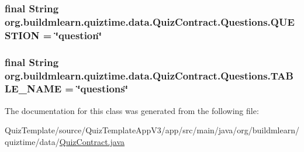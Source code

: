 \subsubsection[{\texorpdfstring{Q\+U\+E\+S\+T\+I\+ON}{QUESTION}}]{\setlength{\rightskip}{0pt plus 5cm}final String org.\+buildmlearn.\+quiztime.\+data.\+Quiz\+Contract.\+Questions.\+Q\+U\+E\+S\+T\+I\+ON = \char`\"{}question\char`\"{}\hspace{0.3cm}{\ttfamily [static]}}\hypertarget{classorg_1_1buildmlearn_1_1quiztime_1_1data_1_1QuizContract_1_1Questions_aa167369c977ff5bb38476d7926e291aa}{}\label{classorg_1_1buildmlearn_1_1quiztime_1_1data_1_1QuizContract_1_1Questions_aa167369c977ff5bb38476d7926e291aa}
\subsubsection[{\texorpdfstring{T\+A\+B\+L\+E\+\_\+\+N\+A\+ME}{TABLE_NAME}}]{\setlength{\rightskip}{0pt plus 5cm}final String org.\+buildmlearn.\+quiztime.\+data.\+Quiz\+Contract.\+Questions.\+T\+A\+B\+L\+E\+\_\+\+N\+A\+ME = \char`\"{}questions\char`\"{}\hspace{0.3cm}{\ttfamily [static]}}\hypertarget{classorg_1_1buildmlearn_1_1quiztime_1_1data_1_1QuizContract_1_1Questions_a2c56c18223490479fcebca4767e5d51d}{}\label{classorg_1_1buildmlearn_1_1quiztime_1_1data_1_1QuizContract_1_1Questions_a2c56c18223490479fcebca4767e5d51d}


The documentation for this class was generated from the following file\+:\begin{DoxyCompactItemize}
\item 
Quiz\+Template/source/\+Quiz\+Template\+App\+V3/app/src/main/java/org/buildmlearn/quiztime/data/\hyperlink{QuizContract_8java}{Quiz\+Contract.\+java}\end{DoxyCompactItemize}
